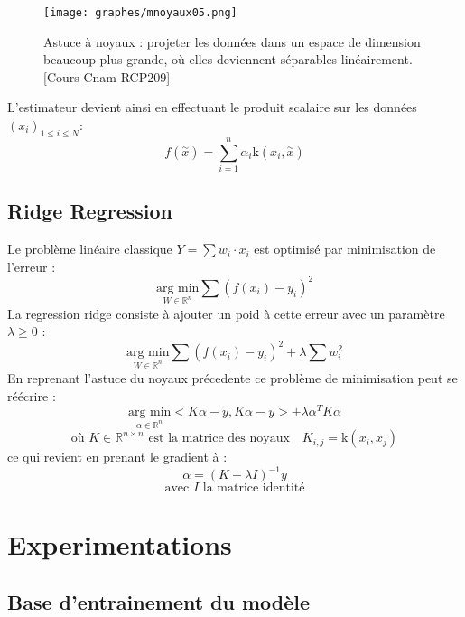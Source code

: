 \documentclass[a4paper,12pt,titlepage]{report}
\begin{document}
\begin{figure}[!h]
		
		\texttt{[image: graphes/mnoyaux05.png]}
		\caption{Astuce à noyaux : projeter les données dans un espace de dimension beaucoup plus grande, où elles deviennent séparables linéairement.[Cours Cnam RCP209]}
\end{figure}

L'estimateur devient ainsi en effectuant le produit scalaire sur les données $(x_{i})_{1 \leqslant i \leqslant N}$:
\[
f(\overset{\sim}{x}) = \sum_{i = 1}^{n}{\alpha_i \text{k}(x_i , \overset{\sim}{x})}
\]


\section{Ridge Regression}

Le problème linéaire classique $Y = \sum{w_i \cdot x_i}$ est optimisé par minimisation de l'erreur :
\[
\underset{W \in \mathbb{R}^{n}}{\text{arg min}}\sum{(f(x_i) - y_i)^{2}}
\]
La regression ridge consiste à ajouter un poid à cette erreur avec un paramètre $\lambda\geqslant 0 $ :
\[
\underset{W \in \mathbb{R}^{n}}{\text{arg min}}\sum{(f(x_i) - y_i)^{2}} +  \lambda \sum{w_{i}^{2}}
\]
En reprenant l'astuce du noyaux précedente ce problème de minimisation peut se réécrire :
\[
	\underset{\alpha \in \mathbb{R}^{n}}{\text{arg min}}<K \alpha - y , K 	\alpha -y > + \lambda \alpha^{T} K \alpha 
\]
\[
	\text{où } K \in \mathbb{R}^{n \times n} \text{ est la matrice des 			noyaux} \quad K_{i,j} = \text{k}(x_i, x_j)
\]
ce qui revient en prenant le gradient à :
\[
\alpha	=(K + \lambda I)^{-1}y 
\]
\[
\text{avec $I$ la matrice identité}
\]

\chapter{Experimentations}


\section{Base d'entrainement du modèle}
\end{document}
